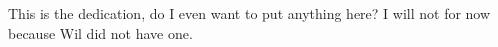 \begin{dedication}
   \null\vfil{%

\begin{minipage}{3.2in}
\begin{center}
This is the dedication, do I even want to put anything here? I will
not for now because Wil did not have one.
\end{center}
\end{minipage}

} \vfil\null
\end{dedication}
